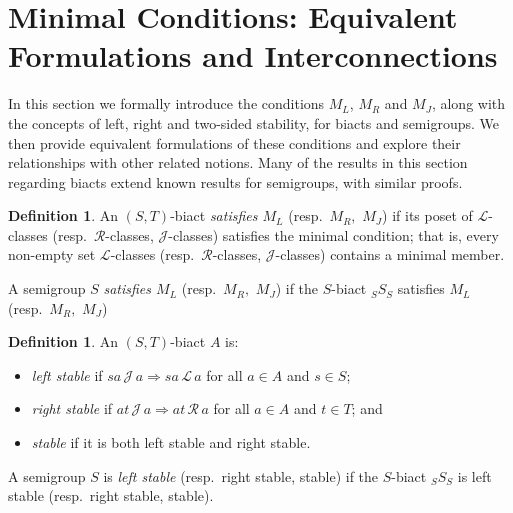 \documentclass[twoside,a4paper,12pt,reqno]{amsart}
\theoremstyle{plain}
\theoremstyle{definition}
\newtheorem{defn}[thm]{Definition}
\renewcommand{\l}{\mbox{${\mathcal{L}}$}}
\renewcommand{\r}{\mbox{${\mathcal{R}}$}}
\renewcommand{\j}{\mbox{${\mathcal{J}}$}}
\newcommand{\leql}{\leq_{\mathcal{L}}}
\newcommand{\leqr}{\leq_{\mathcal{R}}}
\begin{document}
\section{Minimal Conditions: Equivalent Formulations and Interconnections}\label{sec:min}

In this section we formally introduce the conditions $M_L$, $M_R$ and $M_J$, along with the concepts of left, right and two-sided stability, for biacts and semigroups.  We then provide equivalent formulations of these conditions and explore their relationships with other related notions.  Many of the results in this section regarding biacts extend known results for semigroups, with similar proofs. 


\begin{defn}
An $(S,T)$-biact {\em satisfies $M_L$} (resp.\ $M_R,$ $M_J$) if its poset of $\l$-classes (resp.\ $\r$-classes, $\j$-classes) satisfies the minimal condition; that is, every non-empty set $\l$-classes (resp.\ $\r$-classes, $\j$-classes) contains a minimal member.

A semigroup $S$ {\em satisfies $M_L$} (resp.\ $M_R,$ $M_J$) if the $S$-biact ${_S}S_S$ satisfies $M_L$ (resp.\ $M_R,$ $M_J$)
\end{defn}

\begin{defn}
An $(S,T)$-biact $A$ is:
\begin{itemize}
\item {\em left stable} if $sa\,\j\,a\Rightarrow sa\,\l\,a$   for all $a\in A$ and $s\in S$;
\item {\em right stable} if $at\,\j\,a\Rightarrow at\,\r\,a$ for all $a\in A$ and $t\in T$; and
\item {\em stable} if it is both left stable and right stable.
\end{itemize}
A semigroup $S$ is {\em left stable} (resp.\ right stable, stable) if the $S$-biact ${_S}S_S$ is left stable (resp.\ right stable, stable).
\end{defn}
\end{document}
